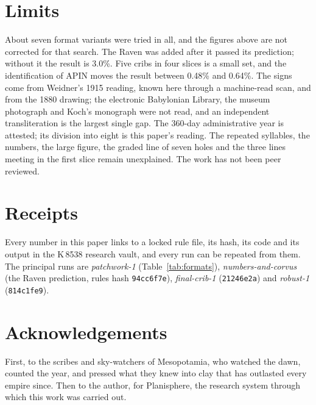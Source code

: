 \documentclass[11pt]{article}
\begin{document}
\section{Limits}

About seven format variants were tried in all, and the figures above are not corrected for that
search. The Raven was added after it passed its prediction; without it the result is 3.0\%. Five
cribs in four slices is a small set, and the identification of APIN moves the result between 0.48\%
and 0.64\%. The signs come from Weidner's 1915 reading, known here through a machine-read scan, and
from the 1880 drawing; the electronic Babylonian Library, the museum photograph and Koch's monograph
were not read, and an independent transliteration is the largest single gap. The 360-day
administrative year is attested; its division into eight is this paper's reading. The repeated
syllables, the numbers, the large figure, the graded line of seven holes and the three lines meeting
in the first slice remain unexplained. The work has not been peer reviewed.

\section*{Receipts}

Every number in this paper links to a locked rule file, its hash, its code and its output in the
K\,8538 research vault, and every run can be repeated from them. The principal runs are \emph{patchwork-1}
(Table~\ref{tab:formats}), \emph{numbers-and-corvus} (the Raven prediction, rules hash
\texttt{94cc6f7e}), \emph{final-crib-1} (\texttt{21246e2a}) and \emph{robust-1} (\texttt{814c1fe9}).

\section*{Acknowledgements}

First, to the scribes and sky-watchers of Mesopotamia, who watched the dawn, counted the year, and
pressed what they knew into clay that has outlasted every empire since. Then to the author, for
Planisphere, the research system through which this work was carried out.
\end{document}
